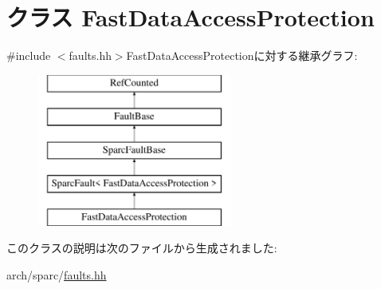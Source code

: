 \hypertarget{classSparcISA_1_1FastDataAccessProtection}{
\section{クラス FastDataAccessProtection}
\label{classSparcISA_1_1FastDataAccessProtection}
}


{\ttfamily \#include $<$faults.hh$>$}FastDataAccessProtectionに対する継承グラフ:\begin{figure}[H]
\begin{center}
\leavevmode
\includegraphics[height=5cm]{classSparcISA_1_1FastDataAccessProtection}
\end{center}
\end{figure}


このクラスの説明は次のファイルから生成されました:\begin{DoxyCompactItemize}
\item 
arch/sparc/\hyperlink{arch_2sparc_2faults_8hh}{faults.hh}\end{DoxyCompactItemize}
